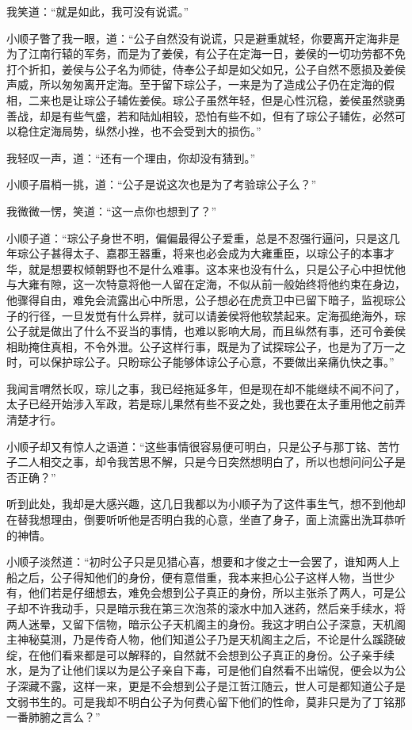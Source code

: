 我笑道：“就是如此，我可没有说谎。”

小顺子瞥了我一眼，道：“公子自然没有说谎，只是避重就轻，你要离开定海非是为了江南行辕的军务，而是为了姜侯，有公子在定海一日，姜侯的一切功劳都不免打个折扣，姜侯与公子名为师徒，侍奉公子却是如父如兄，公子自然不愿损及姜侯声威，所以匆匆离开定海。至于留下琮公子，一来是为了造成公子仍在定海的假相，二来也是让琮公子辅佐姜侯。琮公子虽然年轻，但是心性沉稳，姜侯虽然骁勇善战，却是有些气盛，若和陆灿相较，恐怕有些不如，但有了琮公子辅佐，必然可以稳住定海局势，纵然小挫，也不会受到大的损伤。”

我轻叹一声，道：“还有一个理由，你却没有猜到。”

小顺子眉梢一挑，道：“公子是说这次也是为了考验琮公子么？”

我微微一愣，笑道：“这一点你也想到了？”

小顺子道：“琮公子身世不明，偏偏最得公子爱重，总是不忍强行逼问，只是这几年琮公子甚得太子、嘉郡王器重，将来也必会成为大雍重臣，以琮公子的本事才华，就是想要权倾朝野也不是什么难事。这本来也没有什么，只是公子心中担忧他与大雍有隙，这一次特意将他一人留在定海，不似从前一般始终将他约束在身边，他骤得自由，难免会流露出心中所思，公子想必在虎贲卫中已留下暗子，监视琮公子的行径，一旦发觉有什么异样，就可以请姜侯将他软禁起来。定海孤绝海外，琮公子就是做出了什么不妥当的事情，也难以影响大局，而且纵然有事，还可令姜侯相助掩住真相，不令外泄。公子这样行事，既是为了试探琮公子，也是为了万一之时，可以保护琮公子。只盼琮公子能够体谅公子心意，不要做出亲痛仇快之事。”

我闻言喟然长叹，琮儿之事，我已经拖延多年，但是现在却不能继续不闻不问了，太子已经开始涉入军政，若是琮儿果然有些不妥之处，我也要在太子重用他之前弄清楚才行。

小顺子却又有惊人之语道：“这些事情很容易便可明白，只是公子与那丁铭、苦竹子二人相交之事，却令我苦思不解，只是今日突然想明白了，所以也想问问公子是否正确？”

听到此处，我却是大感兴趣，这几日我都以为小顺子为了这件事生气，想不到他却在替我想理由，倒要听听他是否明白我的心意，坐直了身子，面上流露出洗耳恭听的神情。

小顺子淡然道：“初时公子只是见猎心喜，想要和才俊之士一会罢了，谁知两人上船之后，公子得知他们的身份，便有意借重，我本来担心公子这样人物，当世少有，他们若是仔细想去，难免会想到公子真正的身份，所以主张杀了两人，可是公子却不许我动手，只是暗示我在第三次泡茶的滚水中加入迷药，然后亲手续水，将两人迷晕，又留下信物，暗示公子天机阁主的身份。我这才明白公子深意，天机阁主神秘莫测，乃是传奇人物，他们知道公子乃是天机阁主之后，不论是什么蹊跷破绽，在他们看来都是可以解释的，自然就不会想到公子真正的身份。公子亲手续水，是为了让他们误以为是公子亲自下毒，可是他们自然看不出端倪，便会以为公子深藏不露，这样一来，更是不会想到公子是江哲江随云，世人可是都知道公子是文弱书生的。可是我却不明白公子为何费心留下他们的性命，莫非只是为了丁铭那一番肺腑之言么？”

